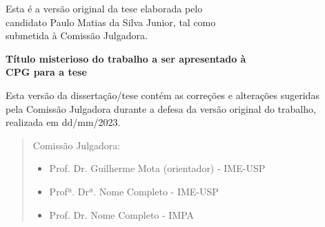 \documentclass[12pt,a4paper]{book}
\begin{document}
    \vskip 2cm

    \begin{flushright}
	Esta é a versão original da tese elaborada pelo\\
	candidato Paulo Matias da Silva Junior, tal como \\
	submetida à Comissão Julgadora.
    \end{flushright}

\pagebreak

%
%
%
%
\newpage
\thispagestyle{empty}
    \begin{center}
        \vspace*{2.3 cm}
        \textbf{\Large{Título misterioso do trabalho a ser apresentado à \\
        CPG para a tese}}\\
        \vspace*{2 cm}
    \end{center}

    \vskip 2cm

    \begin{flushright}
	Esta versão da dissertação/tese contém as correções e alterações sugeridas\\
	pela Comissão Julgadora durante a defesa da versão original do trabalho,\\
	realizada em dd/mm/2023.

    \vskip 2cm

    \end{flushright}
    \vskip 4.2cm

    \begin{quote}
    \noindent Comissão Julgadora:
    
    \begin{itemize}
		\item Prof. Dr. Guilherme Mota (orientador) - IME-USP 
		\item Profª. Drª. Nome Completo - IME-USP %
		\item Prof. Dr. Nome Completo - IMPA %
    \end{itemize}
      
    \end{quote}
\pagebreak
\end{document}
